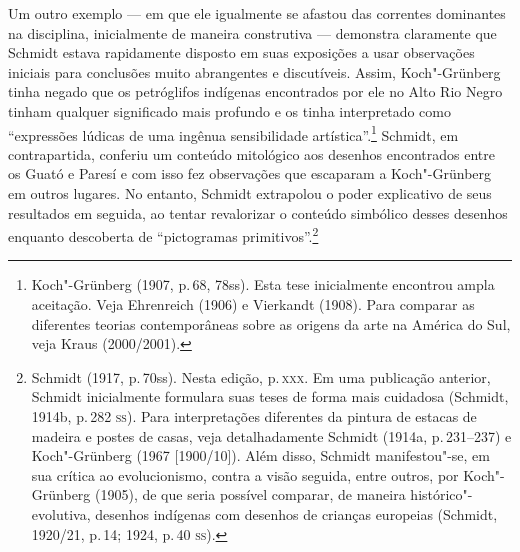Um outro exemplo --- em que ele igualmente se afastou das correntes
dominantes na disciplina, inicialmente de maneira construtiva ---
demonstra claramente que Schmidt estava rapidamente disposto em suas
exposições a usar observações iniciais para conclusões muito abrangentes
e discutíveis. Assim, Koch"-Grünberg tinha negado que os petróglifos
indígenas encontrados por ele no Alto Rio Negro tinham qualquer
significado mais profundo e os tinha interpretado como ``expressões
lúdicas de uma ingênua sensibilidade artística''.\footnote{Koch"-Grünberg
  (1907, p.\,68, 78ss). Esta tese inicialmente encontrou ampla aceitação.
  Veja Ehrenreich (1906) e Vierkandt (1908). Para comparar as
  diferentes teorias contemporâneas sobre as origens da arte na América
  do Sul, veja Kraus (2000/2001).} Schmidt, em contrapartida, conferiu
um conteúdo mitológico aos desenhos encontrados entre os Guató e Paresí
e com isso fez observações que escaparam a Koch"-Grünberg em outros
lugares. No entanto, Schmidt extrapolou o poder explicativo de seus
resultados em seguida, ao tentar revalorizar o conteúdo simbólico
desses desenhos enquanto descoberta de ``pictogramas
primitivos''.\footnote{Schmidt (1917, p.\,70ss). Nesta edição, p.\,\textsc{xxx}.
  Em uma publicação anterior, Schmidt inicialmente formulara suas teses
  de forma mais cuidadosa (Schmidt, 1914b, p.\,282 \textsc{ss}). Para
  interpretações diferentes da pintura de estacas de madeira e postes de
  casas, veja detalhadamente Schmidt (1914a, p.\,231--237) e Koch"-Grünberg
  (1967 {[}1900/10{]}). Além disso, Schmidt manifestou"-se, em sua
  crítica ao evolucionismo, contra a visão seguida, entre outros, por
  Koch"-Grünberg (1905), de que seria possível comparar, de maneira
  histórico"-evolutiva, desenhos indígenas com desenhos de crianças
  europeias (Schmidt, 1920/21, p.\,14; 1924, p.\,40 \textsc{ss}).}


